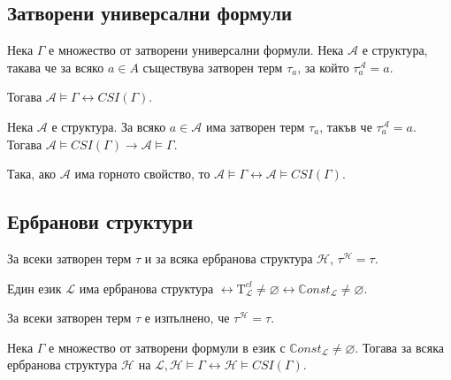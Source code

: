 \documentclass{article}
\newcommand{\Tau}{\mathrm{T}}
\begin{document}
\subsection*{Затворени универсални формули}

\begin{claim}
Нека $\Gamma$ е множество от затворени универсални формули. Нека $\mathcal{A}$ е структура, такава че за всяко $a \in A$ съществува затворен терм $\tau_a$, за който $\tau^\mathcal{A}_a = a$.

Тогава $\mathcal{A} \models \Gamma \longleftrightarrow CSI(\Gamma)$.
\end{claim}

\begin{claim}
Нека $\mathcal{A}$ е структура. За всяко $a \in \mathcal{A}$ има затворен терм $\tau_a$, такъв че $\tau^\mathcal{A}_a = a$. Тогава $\mathcal{A} \models CSI(\Gamma) \longrightarrow \mathcal{A} \models \Gamma$.

Така, ако $\mathcal{A}$ има горното свойство, то $\mathcal{A} \models \Gamma \longleftrightarrow \mathcal{A} \models CSI(\Gamma)$.
\end{claim}

\subsection*{Ербранови структури}

\begin{claim}
За всеки затворен терм $\tau$ и за всяка ербранова структура $\mathcal{H}$, $\tau^\mathcal{H} = \tau$.
\end{claim}

\begin{claim}
Един език $\mathcal{L}$ има ербранова структура $\longleftrightarrow \Tau^{cl}_\mathcal{L} \neq \varnothing \longleftrightarrow \mathbb{C}onst_\mathcal{L} \neq \varnothing$.
\end{claim}

\begin{claim}
За  всеки затворен терм $\tau$ е изпълнено, че $\tau^\mathcal{H} = \tau$.
\end{claim}

\begin{claim}
Нека $\Gamma$ е множество от затворени формули в език с $\mathbb{C}onst_\mathcal{L} \neq \varnothing$. Тогава за всяка ербранова структура $\mathcal{H}$ на $\mathcal{L}, \mathcal{H} \models \Gamma \longleftrightarrow \mathcal{H} \models CSI(\Gamma)$.
\end{claim}
\end{document}
